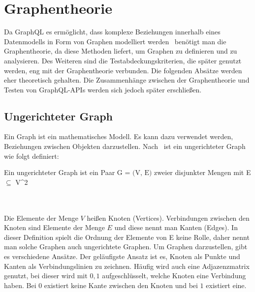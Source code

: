 \section{Graphentheorie}
\label{sec:graphentheorie}

Da GraphQL es ermöglicht, dass komplexe Beziehungen innerhalb eines Datenmodells in Form von Graphen modelliert werden~\cite[vgl. Modelling with Graph(QL)]{graphqlgraphtheory}
benötigt man die Graphentheorie, da diese Methoden liefert, um Graphen zu definieren und zu analysieren.
Des Weiteren sind die Testabdeckungskriterien, die später genutzt werden, eng mit der Graphentheorie verbunden.
Die folgenden Absätze werden eher theoretisch gehalten.
Die Zusammenhänge zwischen der Graphentheorie und Testen von GraphQL-APIs werden sich jedoch später erschließen.

\subsection{Ungerichteter Graph}

Ein Graph ist ein mathematisches Modell.
Es kann dazu verwendet werden, Beziehungen zwischen Objekten darzustellen.
Nach~\cite{graphentheorie} ist ein ungerichteter Graph wie folgt definiert:

\begin{definition}
    Ein ungerichteter Graph ist ein Paar $\textrm{G = (V, E)}$ zweier disjunkter Mengen mit E $\subseteq$ V^2
    \label{graphdef}
\end{definition}\cite[vgl. S.2 0.1 Graphen]{graphentheorie}
\\
\\
Die Elemente der Menge $V$ heißen Knoten (Vertices).
Verbindungen zwischen den Knoten sind Elemente der Menge $E$ und diese nennt man Kanten (Edges).
In dieser Definition spielt die Ordnung der Elemente von E keine Rolle, daher nennt man solche Graphen auch ungerichtete Graphen.
Um Graphen darzustellen, gibt es verschiedene Ansätze.
Der geläufigste Ansatz ist es, Knoten als Punkte und Kanten als Verbindungslinien zu zeichnen.
Häufig wird auch eine Adjazenzmatrix genutzt, bei dieser wird mit $0,1$ aufgeschlüsselt, welche Knoten eine Verbindung haben.
Bei $0$ existiert keine Kante zwischen den Knoten und bei $1$ existiert eine.

